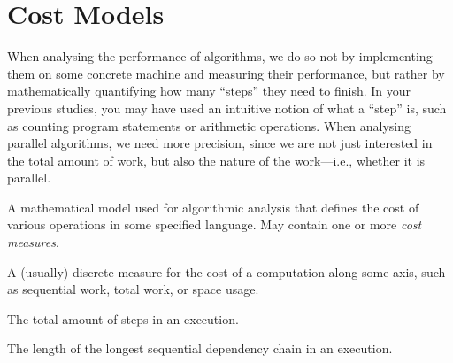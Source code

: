 \chapter{Cost Models}

When analysing the performance of algorithms, we do so not by
implementing them on some concrete machine and measuring their
performance, but rather by mathematically quantifying how many
``steps'' they need to finish. In your previous studies, you may have
used an intuitive notion of what a ``step'' is, such as counting
program statements or arithmetic operations. When analysing parallel
algorithms, we need more precision, since we are not just interested
in the total amount of work, but also the nature of the work---i.e.,
whether it is parallel.

\begin{definition}
  A mathematical model used for algorithmic analysis that defines the
  cost of various operations in some specified language. May contain
  one or more \emph{cost measures}.
\end{definition}

\begin{definition}
  A (usually) discrete measure for the cost of a computation along
  some axis, such as sequential work, total work, or space usage.
\end{definition}

\begin{definition}[Work]
  The total amount of steps in an execution.
\end{definition}

\begin{definition}
  The length of the longest sequential dependency chain in an
  execution.
\end{definition}


